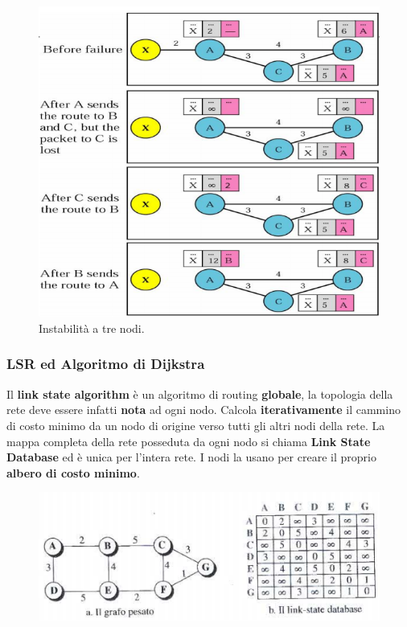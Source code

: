 \documentclass[11pt,a4paper,oneside]{book}
\theoremstyle{definition}
\begin{document}
\begin{figure}[!h]
	\centering
	\includegraphics[scale=0.35]{Immagini/Three_nodes.png}
	\caption{Instabilità a tre nodi.}
\end{figure}

\subsubsection{LSR ed Algoritmo di Dijkstra}
Il \textbf{link state algorithm} è un algoritmo di routing \textbf{globale}, la topologia della rete deve essere infatti \textbf{nota} ad ogni nodo. Calcola \textbf{iterativamente} il cammino di costo minimo da un nodo di origine verso tutti gli altri nodi della rete. La mappa completa della rete posseduta da ogni nodo si chiama \textbf{Link State Database} ed è unica per l'intera rete. I nodi la usano per creare il proprio \textbf{albero di costo minimo}.

\begin{figure}[!h]
	\centering
	\includegraphics[scale=0.62]{Immagini/LSDB.png}
\end{figure}
\end{document}

